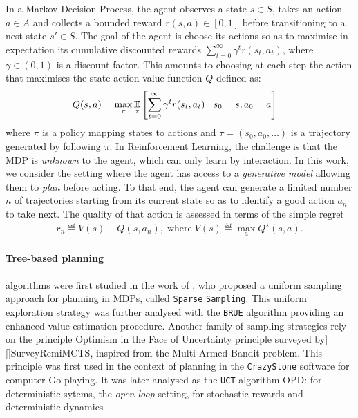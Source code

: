 \documentclass[runningheads]{llncs}
\newcommand{\citep}[1]{\cite{#1}}
\begin{document}
In a Markov Decision Process, the agent observes a state $s\in S$, takes an action $a\in A$ and collects a bounded reward $r(s, a)\in[0, 1]$ before transitioning to a nest state $s'\in S$. The goal of the agent is choose its actions so as to maximise in expectation its cumulative discounted rewards $\sum_{t=0}^\infty \gamma^t r(s_t, a_t)$, where $\gamma\in(0, 1)$ is a discount factor. This amounts to choosing at each step the action that maximises the state-action value function $Q$ defined as:
\begin{align*}
Q(s, a) &= \max_\pi  \operatorname*{\mathbb{E}}_\tau \left[\sum_{t=0}^\infty \gamma^t r(s_t, a_t)\;\middle|\; s_0 = s, a_0 = a\right]
\end{align*}
where $\pi$ is a policy mapping states to actions and $\tau = (s_0, a_0, \dots)$ is a trajectory generated by following $\pi$. In Reinforcement Learning, the challenge is that the MDP is \emph{unknown} to the agent, which can only learn by interaction. In this work, we consider the setting where the agent has access to a \emph{generative model} allowing them to \emph{plan} before acting. To that end, the agent can generate a limited number $n$ of trajectories starting from its current state so as to identify a good action $a_n$ to take next.
The quality of that action is assessed in terms of the simple regret
\begin{align*}
	r_n \eqdef V(s) - Q(s, {a}_n), \; \mbox{where} \; V(s) \eqdef  \max_a Q^\star(s, a).
\end{align*}

\paragraph{Tree-based planning} algorithms were first studied in the work of \cite{Kearns02SS}, who proposed a uniform sampling approach for planning in MDPs, called \texttt{Sparse} \texttt{Sampling}. This uniform exploration strategy was further analysed with the \texttt{BRUE} algorithm
\cite{Feldman14BRUE} providing an enhanced value estimation procedure. Another family of sampling strategies rely on the principle Optimism in the Face of Uncertainty principle \citep[surveyed by][]{SurveyRemiMCTS}, inspired from the Multi-Armed Bandit problem. This principle was first used in the context of planning in the \texttt{CrazyStone} software \citep{Coulom2006} for computer Go playing. It was later analysed as the \texttt{UCT} algorithm 
OPD: \citep{hren2008optimistic} for deterministic sytems, 
the \emph{open loop} setting, for stochastic rewards and deterministic dynamics \citep{bubeck2010open,leurent2019practical}
\end{document}
